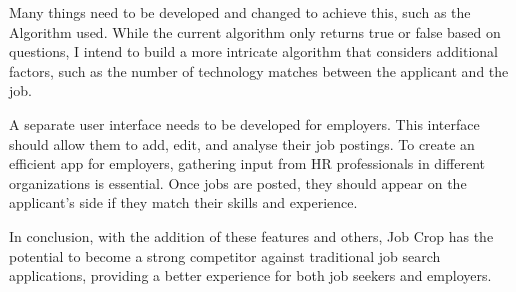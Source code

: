 Many things need to be developed and changed to achieve this, such as the Algorithm used. While the current algorithm only returns true or false based on questions, I intend to build a more intricate algorithm that considers additional factors, such as the number of technology matches between the applicant and the job.

A separate user interface needs to be developed for employers. This interface should allow them to add, edit, and analyse their job postings. To create an efficient app for employers, gathering input from HR professionals in different organizations is essential. Once jobs are posted, they should appear on the applicant's side if they match their skills and experience.

In conclusion, with the addition of these features and others, Job Crop has the potential to become a strong competitor against traditional job search applications, providing a better experience for both job seekers and employers.